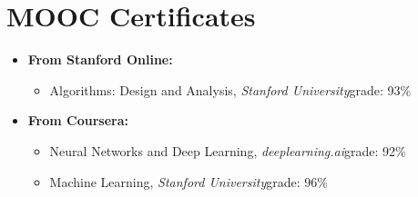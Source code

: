 \documentclass[12pt,a4paper,sans]{moderncv}        %
\begin{document}
\section{MOOC Certificates}

\vspace{6pt}

\begin{itemize}

\item{\textbf{From Stanford Online:}
\vspace{3pt}
\begin{itemize}
\item{Algorithms: Design and Analysis, \textit{Stanford University}\hfill{grade:  93\%}}
\vspace{3pt}
\end{itemize}}


\item{\textbf{From Coursera:}
\vspace{3pt}
\begin{itemize}
\item{Neural Networks and Deep Learning, \textit{deeplearning.ai}\hfill{grade:  92\%}}
\vspace{3pt}

\item{Machine Learning, \textit{Stanford University}\hfill{grade:  96\%}}
\vspace{3pt}

\end{itemize}}

\end{itemize}

\nocite{*}



\end{document}
